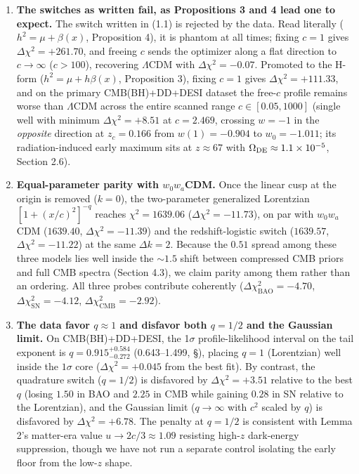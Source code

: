 \documentclass[11pt,a4paper]{article}
\begin{document}
\begin{enumerate}
\item{} {\bfseries\boldmath The switches as written fail, as Propositions 3 and 4 lead one to expect.} The switch written in (1.1) is rejected by the data. Read literally ($h^2 = \mu + \beta(x)$, Proposition 4), it is phantom at all times; fixing $c = 1$ gives $\Delta\chi^2 = +261.70$, and freeing $c$ sends the optimizer along a flat direction to $c \to \infty$ ($c > 100$), recovering $\Lambda$CDM with $\Delta\chi^2 = -0.07$. Promoted to the H-form ($h^2 = \mu + h\beta(x)$, Proposition 3), fixing $c = 1$ gives $\Delta\chi^2 = +111.33$, and on the primary CMB(BH)+DD+DESI dataset the free-$c$ profile remains worse than $\Lambda$CDM across the entire scanned range $c \in [0.05, 1000]$ (single well with minimum $\Delta\chi^2 = +8.51$ at $c = 2.469$, crossing $w = -1$ in the \emph{opposite} direction at $z_c = 0.166$ from $w(1) = -0.904$ to $w_0 = -1.011$; its radiation-induced early maximum sits at $z \approx 67$ with $\Omega_{\rm DE} \approx 1.1 \times 10^{-5}$, Section 2.6).
\item{} {\bfseries\boldmath Equal-parameter parity with $w_0 w_a$CDM.} Once the linear cusp at the origin is removed ($k = 0$), the two-parameter generalized Lorentzian $[1 + (x/c)^2]^{-q}$ reaches $\chi^2 = 1639.06$ ($\Delta\chi^2 = -11.73$), on par with $w_0 w_a$CDM ($1639.40$, $\Delta\chi^2 = -11.39$) and the redshift-logistic switch ($1639.57$, $\Delta\chi^2 = -11.22$) at the same $\Delta k = 2$. Because the $0.51$ spread among these three models lies well inside the $\sim 1.5$ shift between compressed CMB priors and full CMB spectra (Section 4.3), we claim parity among them rather than an ordering. All three probes contribute coherently ($\Delta\chi^2_{\text{BAO}} = -4.70$, $\Delta\chi^2_{\text{SN}} = -4.12$, $\Delta\chi^2_{\text{CMB}} = -2.92$).
\item{} {\bfseries\boldmath The data favor $q \approx 1$ and disfavor both $q = 1/2$ and the Gaussian limit.} On CMB(BH)+DD+DESI, the 1$\sigma$ profile-likelihood interval on the tail exponent is $q = 0.915^{+0.584}_{-0.272}$ (0.643--1.499, \S{}), placing $q = 1$ (Lorentzian) well inside the $1\sigma$ core ($\Delta\chi^2 = +0.045$ from the best fit). By contrast, the quadrature switch ($q = 1/2$) is disfavored by $\Delta\chi^2 = +3.51$ relative to the best $q$ (losing $1.50$ in BAO and $2.25$ in CMB while gaining $0.28$ in SN relative to the Lorentzian), and the Gaussian limit ($q \to \infty$ with $c^2$ scaled by $q$) is disfavored by $\Delta\chi^2 = +6.78$. The penalty at $q = 1/2$ is consistent with Lemma 2's matter-era value $u \to 2c/3 \approx 1.09$ resisting high-$z$ dark-energy suppression, though we have not run a separate control isolating the early floor from the low-$z$ shape.

\end{enumerate}
\end{document}

